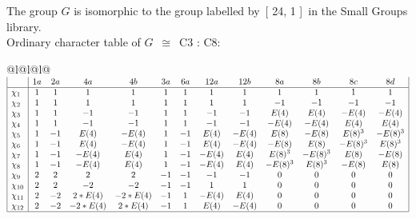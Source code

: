 \documentclass[varwidth=\maxdimen,border=10]{standalone}
\begin{document}
The group $G$ is isomorphic to the group labelled by\ [ 24, 1 ]\ in the Small Groups library.\\
Ordinary character table of $G$\ $\cong$\ C3 : C8:\\
\begin{center}
\begin{tabular}{@{}l@{}l@{}l@{}}
\hline
\(\begin{array}{|l|cccccccccccc|}
  & 1a & 2a & 4a & 4b & 3a & 6a & 12a & 12b & 8a & 8b & 8c & 8d\\ \hline
\chi_{1} & 1 & 1 & 1 & 1 & 1 & 1 & 1 & 1 & 1 & 1 & 1 & 1\\
\chi_{2} & 1 & 1 & 1 & 1 & 1 & 1 & 1 & 1 & -1 & -1 & -1 & -1\\
\chi_{3} & 1 & 1 & -1 & -1 & 1 & 1 & -1 & -1 & E(4) & E(4) & -E(4) & -E(4)\\
\chi_{4} & 1 & 1 & -1 & -1 & 1 & 1 & -1 & -1 & -E(4) & -E(4) & E(4) & E(4)\\
\chi_{5} & 1 & -1 & E(4) & -E(4) & 1 & -1 & E(4) & -E(4) & E(8) & -E(8) & E(8)^{3} & -E(8)^{3}\\
\chi_{6} & 1 & -1 & E(4) & -E(4) & 1 & -1 & E(4) & -E(4) & -E(8) & E(8) & -E(8)^{3} & E(8)^{3}\\
\chi_{7} & 1 & -1 & -E(4) & E(4) & 1 & -1 & -E(4) & E(4) & E(8)^{3} & -E(8)^{3} & E(8) & -E(8)\\
\chi_{8} & 1 & -1 & -E(4) & E(4) & 1 & -1 & -E(4) & E(4) & -E(8)^{3} & E(8)^{3} & -E(8) & E(8)\\
\chi_{9} & 2 & 2 & 2 & 2 & -1 & -1 & -1 & -1 & 0 & 0 & 0 & 0\\
\chi_{10} & 2 & 2 & -2 & -2 & -1 & -1 & 1 & 1 & 0 & 0 & 0 & 0\\
\chi_{11} & 2 & -2 & 2*E(4) & -2*E(4) & -1 & 1 & -E(4) & E(4) & 0 & 0 & 0 & 0\\
\chi_{12} & 2 & -2 & -2*E(4) & 2*E(4) & -1 & 1 & E(4) & -E(4) & 0 & 0 & 0 & 0\\
\hline
\end{array}\)\\
\end{tabular}
\end{center}
\end{document}
